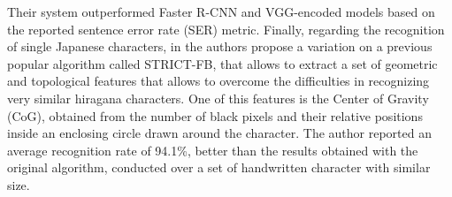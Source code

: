Their system outperformed Faster R-CNN and VGG-encoded models based on the reported sentence error rate (SER) metric. Finally, regarding the recognition of single Japanese characters, in \cite{School_of_Engineering_Technology_West_Bengal_University_of_Technology_India2014-wb} the authors propose a variation on a previous popular algorithm called STRICT-FB, that allows to extract a set of geometric and topological features that allows to overcome the difficulties in recognizing very similar hiragana characters. One of this features is the Center of Gravity (CoG), obtained from the number of black pixels and their relative positions inside an enclosing circle drawn around the character. The author reported an average recognition rate of 94.1\%, better than the results obtained with the original algorithm, conducted over a set of handwritten character with similar size.